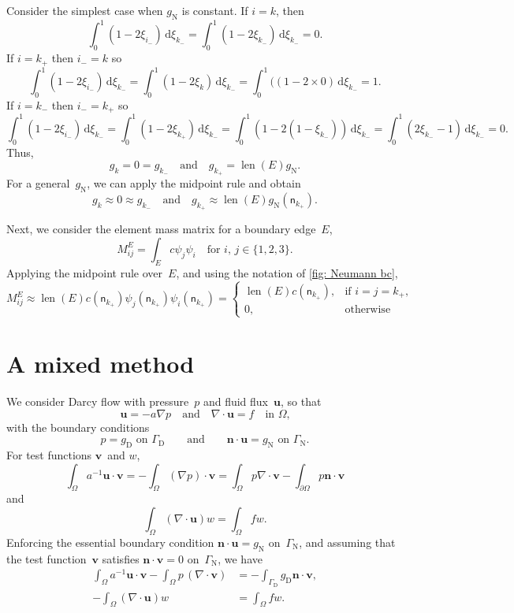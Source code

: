 \documentclass[a4paper,12pt]{article}
\newcommand{\bs}[1]{\boldsymbol{#1}}
\newcommand{\len}{\operatorname{len}}
\newcommand{\ud}{\mathrm{d}}
\newcommand{\uD}{\mathrm{D}}
\newcommand{\uN}{\mathrm{N}}
\newcommand{\gN}{g_{\uN}}
\begin{document}
Consider the simplest case when $\gN$ is constant.  If $i=k$, then
\[
\int_0^1(1-2\xi_{i_-})\,\ud\xi_{k_-}
    =\int_0^1(1-2\xi_{k_-})\,\ud\xi_{k_-}=0.
\]
If $i=k_+$ then $i_-=k$ so
\[
\int_0^1(1-2\xi_{i_-})\,\ud\xi_{k_-}
    =\int_0^1(1-2\xi_k)\,\ud\xi_{k_-}
    =\int_0^1((1-2\times0)\,\ud\xi_{k_-}=1.
\]
If $i=k_-$ then $i_-=k_+$ so
\[
\int_0^1(1-2\xi_{i_-})\,\ud\xi_{k_-}
    =\int_0^1(1-2\xi_{k_+})\,\ud\xi_{k_-}
    =\int_0^1(1-2(1-\xi_{k_-}))\,\ud\xi_{k_-}
    =\int_0^1(2\xi_{k_-}-1)\,\ud\xi_{k_-}=0.
\]
Thus,
\begin{equation}\label{eq: Neumann load vec nonconforming}
g_k=0=g_{k_-}\quad\text{and}\quad g_{k_+}=\len(E)\gN.
\end{equation}
For a general~$\gN$, we can apply the midpoint rule and obtain
\[
g_k\approx 0\approx g_{k_-}\quad\text{and}\quad
g_{k_+}\approx\len(E)\gN(\mathsf{n}_{k_+}).
\]

Next, we consider the element mass matrix for a boundary edge~$E$,
\[
M^E_{ij}=\int_Ec\psi_j\psi_i\quad\text{for $i$, $j\in\{1,2,3\}$.}
\]
Applying the midpoint rule over~$E$, and using the notation of
\cref{fig: Neumann bc},
\[
M^E_{ij}\approx\len(E)c(\mathsf{n}_{k_+})\psi_j(\mathsf{n}_{k_+})
    \psi_i(\mathsf{n}_{k_+})
    =\begin{cases}
    \len(E)c(\mathsf{n}_{k_+}),&\text{if $i=j=k_+$,}\\
    0,&\text{otherwise}
\end{cases}
\]

\section{A mixed method}
We consider Darcy flow with pressure~$p$ and fluid flux~$\bs{u}$, so that
\[
\bs{u}= -a\nabla p\quad\text{and}\quad\nabla\cdot\bs{u}=f
    \quad\text{in $\Omega$,}
\]
with the boundary conditions
\[
\text{$p=g_{\uD}$ on $\Gamma_{\uD}$}\qquad\text{and}\qquad
\text{$\bs{n}\cdot\bs{u}=g_{\uN}$ on $\Gamma_{\uN}$.}
\]
For test functions $\bs{v}$~and $w$,
\[
\int_\Omega a^{-1}\bs{u}\cdot\bs{v}=-\int_\Omega(\nabla p)\cdot\bs{v}
    =\int_\Omega p\nabla\cdot\bs{v}
    -\int_{\partial\Omega}p\bs{n}\cdot\bs{v}
\]
and
\[
\int_\Omega(\nabla\cdot\bs{u})w=\int_\Omega fw.
\]
Enforcing the essential boundary condition $\bs{n}\cdot\bs{u}=g_{\uN}$
on~$\Gamma_{\uN}$, and assuming that the test function~$\bs{v}$ satisfies
$\bs{n}\cdot\bs{v}=0$ on~$\Gamma_{\uN}$, we have
\begin{align*}
\int_{\Omega}a^{-1}\bs{u}\cdot\bs{v}-\int_\Omega p\,(\nabla\cdot\bs{v})
    &=-\int_{\Gamma_{\uD}}g_{\uD}\bs{n}\cdot\bs{v},\\
-\int_\Omega(\nabla\cdot\bs{u})w&=\int_\Omega fw.
\end{align*}
\end{document}
